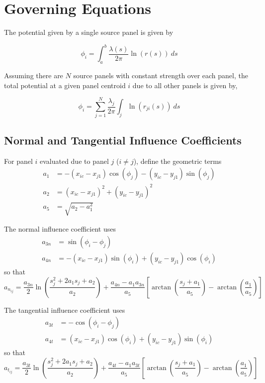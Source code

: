\section{Governing Equations}
\label{sec:governing_equations}

The potential given by a single source panel is given by

\[
\phi_i = \int_{a}^{b} \frac{\lambda(s)}{2\pi} \ln(r(s)) \ ds
\]

Assuming there are $N$ source panels with constant strength over each panel, the total potential at a given panel
centroid $i$ due to all other panels is given by,

\[
\phi_i = \sum_{j=1}^{N} \frac{\lambda_j}{2\pi} \int_{j} \ln(r_{ji}(s)) \ ds
\]

\subsection{Normal and Tangential Influence Coefficients}
\label{subsec:normal_and_tangential_influence_coefficients}

For panel $i$ evaluated due to panel $j$ ($i \neq j$), define the geometric terms
\begin{align*}
    a_1 &= -(x_{ic} - x_{j1})\cos(\phi_j) - (y_{ic} - y_{j1})\sin(\phi_j) \\
    a_2 &= (x_{ic} - x_{j1})^2 + (y_{ic} - y_{j1})^2 \\
    a_5 &= \sqrt{a_2 - a_1^2}
\end{align*}

The normal influence coefficient uses
\begin{align*}
    a_{3n} &= \sin(\phi_i - \phi_j) \\
    a_{4n} &= -(x_{ic} - x_{j1})\sin(\phi_i) + (y_{ic} - y_{j1})\cos(\phi_i)
\end{align*}
so that
\[
    a_{n_{ij}} = \frac{a_{3n}}{2} \ln\!\left(\frac{s_j^2 + 2 a_1 s_j + a_2}{a_2}\right) + \frac{a_{4n} - a_1 a_{3n}}{a_5}\left[\arctan\!\left(\frac{s_j + a_1}{a_5}\right) - \arctan\!\left(\frac{a_1}{a_5}\right)\right]
\]

The tangential influence coefficient uses
\begin{align*}
    a_{3t} &= -\cos(\phi_i - \phi_j) \\
    a_{4t} &= (x_{ic} - x_{j1})\cos(\phi_i) + (y_{ic} - y_{j1})\sin(\phi_i)
\end{align*}
so that
\[
    a_{t_{ij}} = \frac{a_{3t}}{2} \ln\!\left(\frac{s_j^2 + 2 a_1 s_j + a_2}{a_2}\right) + \frac{a_{4t} - a_1 a_{3t}}{a_5}\left[\arctan\!\left(\frac{s_j + a_1}{a_5}\right) - \arctan\!\left(\frac{a_1}{a_5}\right)\right]
\]

